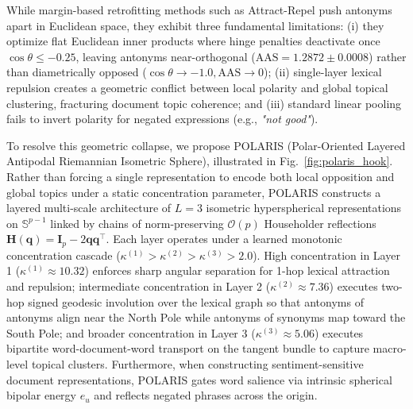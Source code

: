 \documentclass[journal]{IEEEtran}
\begin{document}
While margin-based retrofitting methods such as Attract-Repel \cite{mrksic2017semantic} push antonyms apart in Euclidean space, they exhibit three fundamental limitations: (i) they optimize flat Euclidean inner products where hinge penalties deactivate once $\cos\theta \le -0.25$, leaving antonyms near-orthogonal ($\text{AAS} = 1.2872 \pm 0.0008$) rather than diametrically opposed ($\cos\theta \to -1.0, \text{AAS} \to 0$); (ii) single-layer lexical repulsion creates a geometric conflict between local polarity and global topical clustering, fracturing document topic coherence; and (iii) standard linear pooling fails to invert polarity for negated expressions (e.g., \textit{"not good"}).

To resolve this geometric collapse, we propose POLARIS (Polar-Oriented Layered Antipodal Riemannian Isometric Sphere), illustrated in Fig.~\ref{fig:polaris_hook}. Rather than forcing a single representation to encode both local opposition and global topics under a static concentration parameter, POLARIS constructs a layered multi-scale architecture of $L = 3$ isometric hyperspherical representations on $\mathbb{S}^{p-1}$ linked by chains of norm-preserving $\mathcal{O}(p)$ Householder reflections $\mathbf{H}(\mathbf{q}) = \mathbf{I}_p - 2\mathbf{q}\mathbf{q}^\top$. Each layer operates under a learned monotonic concentration cascade ($\kappa^{(1)} > \kappa^{(2)} > \kappa^{(3)} > 2.0$). High concentration in Layer 1 ($\kappa^{(1)} \approx 10.32$) enforces sharp angular separation for 1-hop lexical attraction and repulsion; intermediate concentration in Layer 2 ($\kappa^{(2)} \approx 7.36$) executes two-hop signed geodesic involution over the lexical graph so that antonyms of antonyms align near the North Pole while antonyms of synonyms map toward the South Pole; and broader concentration in Layer 3 ($\kappa^{(3)} \approx 5.06$) executes bipartite word-document-word transport on the tangent bundle to capture macro-level topical clusters. Furthermore, when constructing sentiment-sensitive document representations, POLARIS gates word salience via intrinsic spherical bipolar energy $e_u$ and reflects negated phrases across the origin.
\end{document}
